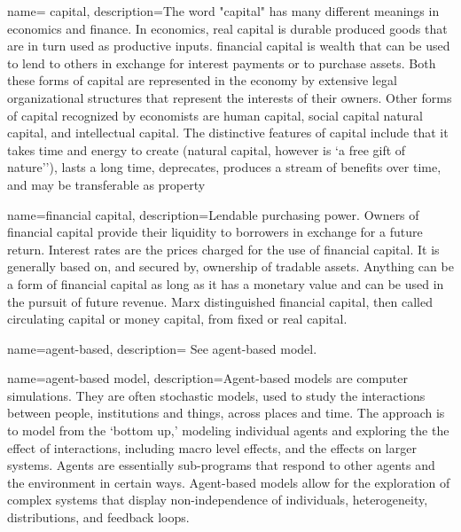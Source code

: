 {
name= capital,
description={The word "capital" has many different meanings in economics and finance.  In economics, real capital is durable produced goods that are in turn used as productive inputs. \Gls{financial capital} is wealth that can be used to lend to others in exchange for interest payments or to purchase assets. Both these forms of capital are represented in the economy by extensive legal organizational structures that represent the interests of their owners. Other forms of capital recognized by economists are human capital, social capital natural capital, and intellectual capital. The distinctive  features of capital include that it takes time and energy to create (natural capital, however is  `a free gift of nature''), lasts a long time, deprecates, produces a stream of benefits over time,  and may be transferable as property}
}

{
name=financial capital,
description={Lendable purchasing power. Owners of financial capital provide their liquidity to borrowers in exchange for a future return. Interest rates are the prices charged for the use of financial capital. It is generally based on, and  secured by, ownership of tradable assets. Anything can be a form of financial capital as long as it has a monetary value and can be used in the pursuit of future revenue. Marx distinguished financial capital, then called circulating capital or money capital, from fixed or real capital.}
}

{
name=agent-based,
description={%
See \gls{agent-based model}.}
}

{
name=agent-based model,
description={Agent-based models are computer simulations. They are often stochastic
models, used to study the interactions between people, institutions and things, across places and time. The approach is to model from the `bottom up,' modeling individual agents and exploring the the effect of interactions, including macro level effects, and the effects on larger systems. %
Agents are essentially sub-programs that respond to other agents and the environment in certain ways. %
Agent-based models allow for the exploration of \glspl{complex system} that display non-independence of individuals, heterogeneity, distributions,  and \gls{feedback} loops. %
}
}

